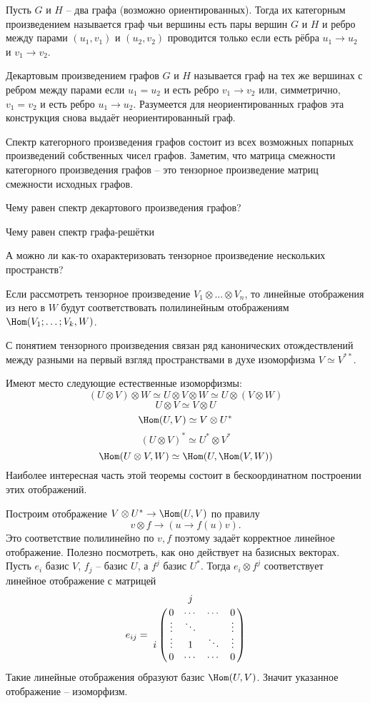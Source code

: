  

 Пусть $G$ и $H$ -- два графа (возможно ориентированных). Тогда их категорным произведением называется граф чьи вершины есть пары вершин $G$ и $H$ и ребро между парами $(u_1,v_1)$ и $(u_2,v_2)$ проводится только если есть рёбра $u_1 \to u_2$ и $v_1 \to v_2$.

Декартовым произведением графов $G$ и $H$ называется граф на тех же вершинах с ребром между парами если $u_1=u_2$ и есть ребро $v_1\to v_2$ или, симметрично, $v_1=v_2$ и есть ребро $u_1 \to u_2$. Разумеется для неориентированных графов эта конструкция снова выдаёт неориентированный граф.
\edfn


\crl Спектр категорного произведения графов состоит из всех возможных попарных произведений собственных чисел графов.
\proof Заметим, что матрица смежности категорного произведения графов -- это тензорное произведение матриц смежности исходных графов.
\endproof
\ecrl



\zd Чему равен спектр декартового произведения графов?
\ezd

\zd Чему равен спектр графа-решётки
\ezd

А можно ли как-то охарактеризовать тензорное произведение нескольких пространств?

\rm Если рассмотреть тензорное произведение $V_1\otimes \dots \otimes V_n$, то линейные отображения из него в $W$ будут соответствовать полилинейным отображениям $\Hom(V_1;\dots ;V_k, W)$.
\erm

С понятием тензорного произведения связан ряд канонических отождествлений между разными на первый взгляд пространствами в духе изоморфизма $V \simeq V^{**}$.

\thrm Имеют место следующие естественные изоморфизмы: 
$$(U \otimes V) \otimes W \simeq U \otimes V \otimes W \simeq U \otimes (V \otimes W)$$
$$ U \otimes V \simeq V \otimes U $$
$$ \Hom (U,V) \simeq  V \otimes U^*$$
$$(U \otimes V)^{*} \simeq U^{*}\otimes V^{*} $$
$$\Hom (U\otimes V,  W) \simeq \Hom (U, \Hom (V,W))$$
\proof Наиболее интересная часть этой теоремы состоит в бескоординатном построении этих отображений.

Построим отображение $V\otimes U^{*} \to \Hom (U,V)$ по правилу $$v\otimes f \to (u \to f(u)v).$$
Это соответствие полилинейно по $v,f$ поэтому задаёт корректное линейное отображение. Полезно посмотреть, как оно действует на базисных векторах. Пусть $e_i$ базис $V$, $f_j$ -- базис $U$, а $f^j$ базис $U^{*}$. Тогда $e_i\otimes f^j$ соответствует линейное отображение с матрицей 
$$ e_{ij}= \bordermatrix{
 & &j&& \cr
 &0&\cdots&\cdots&0\cr
 &\vdots&\ddots && \vdots\cr
i&\vdots& 1 & \ddots& \vdots\cr
 &0&\cdots& \cdots&0
}$$
Такие линейные отображения образуют базис $\Hom(U,V)$. Значит указанное отображение -- изоморфизм.

